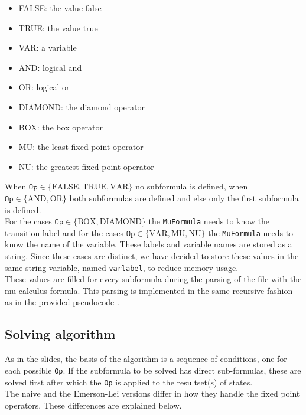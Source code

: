 \documentclass[10pt,a4paper]{article}
\begin{document}
\begin{itemize}
\item FALSE: the value false
\item TRUE: the value true
\item VAR: a variable
\item AND: logical and
\item OR: logical or
\item DIAMOND: the diamond operator
\item BOX: the box operator
\item MU: the least fixed point operator
\item NU: the greatest fixed point operator
\end{itemize}

When $\texttt{Op} \in \{\text{FALSE}, \text{TRUE}, \text{VAR}\}$ no subformula is defined, when $\texttt{Op} \in \{\text{AND}, \text{OR}\}$ both subformulas are defined and else only the first subformula is defined. \\
For the cases $\texttt{Op} \in \{\text{BOX}, \text{DIAMOND}\}$ the \texttt{MuFormula} needs to know the transition label and for the cases $\texttt{Op} \in \{\text{VAR}, \text{MU}, \text{NU}\}$ the \texttt{MuFormula} needs to know the name of the variable. These labels and variable names are stored as a string. Since these cases are distinct, we have decided to store these values in the same string variable, named \texttt{varlabel}, to reduce memory usage.\\
These values are filled for every subformula during the parsing of the file with the mu-calculus formula. This parsing is implemented in the same recursive fashion as in the provided pseudocode \cite{muparse}.

\subsection{Solving algorithm}
As in the slides, the basis of the algorithm is a sequence of conditions, one for each possible \texttt{Op}. If the subformula to be solved has direct sub-formulas, these are solved first after which the \texttt{Op} is applied to the resultset(s) of states.\\
The naive and the Emerson-Lei versions differ in how they handle the fixed point operators. These differences are explained below.

\end{document}
